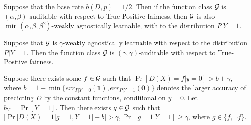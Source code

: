 \iffalse
\begin{theorem}\label{red3}
  Suppose that the base rate $b(D, p) = 1/2$. Then if the function
  class $\mathcal{G}$ is $(\alpha, \beta)$ auditable with respect to
  True-Positive fairness, then $\mathcal{G}$ is also
  $\min(\alpha, \beta, \beta^2)$-weakly agnostically learnable, with
  to the distribution $P|Y = 1$.
 \end{theorem}

 \begin{theorem}\label{red4}
   Suppose that $\mathcal{G}$ is $\gamma$-weakly agnostically learnable with
   respect to the distribution $P|Y = 1$. Then the function class
   $\mathcal{G}$ is $(\gamma, \gamma)$-auditable with respect to True-Positive
   fairness.
\end{theorem}



\begin{lemma}
  Suppose there exists some $f \in \mathcal{G}$ such that
  $\Pr[D(X) = f | y = 0] > b + \gamma$, where
  $b = 1- \min\{err_{P|Y = 0}(\mathbf{1}), err_{P|Y =1}(\mathbf{0})\}$
  denotes the larger accuracy of predicting $D$ by the constant
  functions, conditional on $y = 0$.  Let $b_Y = \Pr[Y = 1]$.  Then
  there exists $g \in \mathcal{G}$ such that
  $|\Pr[D(X) = 1|g = 1, Y = 1] -b| > \gamma, \Pr[g = 1|Y = 1] \geq
  \gamma$, where $g \in \{f, \neg f\}$.
\end{lemma}







